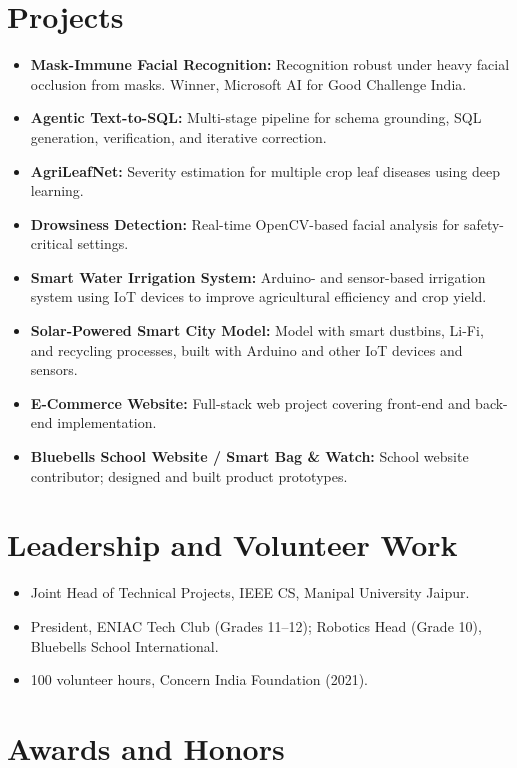 \documentclass[a4paper,10pt]{article}
\begin{document}
\section*{Projects}

\begin{itemize}[label=--]
    \item \textbf{Mask-Immune Facial Recognition:} Recognition robust under heavy facial occlusion from masks. Winner, Microsoft AI for Good Challenge India.
    \item \textbf{Agentic Text-to-SQL:} Multi-stage pipeline for schema grounding, SQL generation, verification, and iterative correction.
    \item \textbf{AgriLeafNet:} Severity estimation for multiple crop leaf diseases using deep learning.
    \item \textbf{Drowsiness Detection:} Real-time OpenCV-based facial analysis for safety-critical settings.
    \item \textbf{Smart Water Irrigation System:} Arduino- and sensor-based irrigation system using IoT devices to improve agricultural efficiency and crop yield.
    \item \textbf{Solar-Powered Smart City Model:} Model with smart dustbins, Li-Fi, and recycling processes, built with Arduino and other IoT devices and sensors.
    \item \textbf{E-Commerce Website:} Full-stack web project covering front-end and back-end implementation.
    \item \textbf{Bluebells School Website / Smart Bag \& Watch:} School website contributor; designed and built product prototypes.
\end{itemize}

\section*{Leadership and Volunteer Work}

\begin{itemize}[label=--]
    \item Joint Head of Technical Projects, IEEE CS, Manipal University Jaipur.
    \item President, ENIAC Tech Club (Grades 11--12); Robotics Head (Grade 10), Bluebells School International.
    \item 100 volunteer hours, Concern India Foundation (2021).
\end{itemize}

\section*{Awards and Honors}
\end{document}
